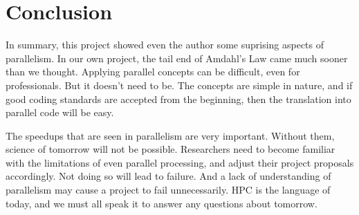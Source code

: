 
\section{Conclusion}
In summary, this project showed even the author some suprising aspects of parallelism. In our own project,
the tail end of Amdahl's Law came much sooner than we thought. Applying parallel concepts can be difficult,
even for professionals. But it doesn't need to be. The concepts are simple in nature, and if good coding 
standards are accepted from the beginning, then the translation into parallel code will be easy.

The speedups that are seen in parallelism are very important. Without them, science of tomorrow will not be
possible. Researchers need to become familiar with the limitations of even parallel processing, and adjust their
project proposals accordingly. Not doing so will lead to failure. And a lack of understanding of parallelism may
cause a project to fail unnecessarily. HPC is the language of today, and we must all speak it to answer any 
questions about tomorrow.